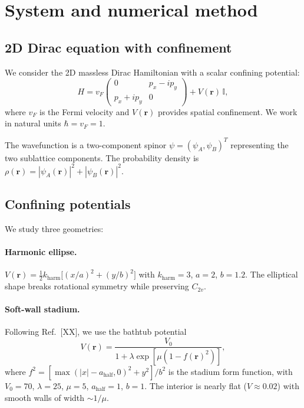 \documentclass[11pt,a4paper]{article}
\newcommand{\vb}[1]{\mathbf{#1}}
\begin{document}
\section{System and numerical method}
\label{sec:method}

\subsection{2D Dirac equation with confinement}

We consider the 2D massless Dirac Hamiltonian with a scalar confining potential:
\begin{equation}
  H = v_F \begin{pmatrix} 0 & p_x - ip_y \\ p_x + ip_y & 0 \end{pmatrix}
      + V(\vb{r})\,\mathbb{I},
  \label{eq:hamiltonian}
\end{equation}
where $v_F$ is the Fermi velocity and $V(\vb{r})$ provides spatial confinement.
We work in natural units $\hbar = v_F = 1$.

The wavefunction is a two-component spinor $\psi = (\psi_A, \psi_B)^T$ representing
the two sublattice components.  The probability density is
$\rho(\vb{r}) = |\psi_A(\vb{r})|^2 + |\psi_B(\vb{r})|^2$.

\subsection{Confining potentials}

We study three geometries:

\paragraph{Harmonic ellipse.}
$V(\vb{r}) = \tfrac{1}{2}k_\text{harm}\bigl[(x/a)^2 + (y/b)^2\bigr]$
with $k_\text{harm} = 3$, $a = 2$, $b = 1.2$.  The elliptical shape breaks
rotational symmetry while preserving $C_{2v}$.

\paragraph{Soft-wall stadium.}
Following Ref.~[XX], we use the bathtub potential
\begin{equation}
  V(\vb{r}) = \frac{V_0}{1 + \lambda\exp[\mu(1 - f(\vb{r})^2)]},
  \label{eq:softwall}
\end{equation}
where $f^2 = [\max(|x|-a_\text{half},0)^2 + y^2]/b^2$ is the stadium form function,
with $V_0 = 70$, $\lambda = 25$, $\mu = 5$, $a_\text{half} = 1$, $b = 1$.
The interior is nearly flat ($V \approx 0.02$) with smooth walls of width $\sim 1/\mu$.
\end{document}
